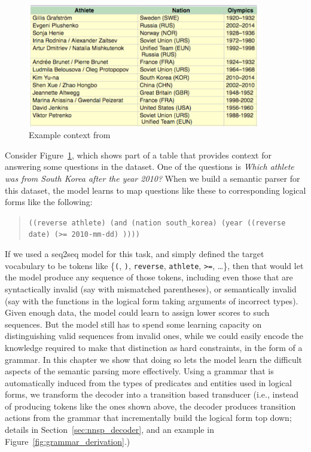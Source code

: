\begin{figure}
	\begin{center}
		\includegraphics[width=4in]{figures/wikitables_example2.png}
		\caption{Example context from
		\WTQ{}~\citep{pasupat2015compositional}}\label{fig:wikitables_reasoning_example}
	\end{center}
\end{figure}
Consider
Figure~\ref{fig:wikitables_reasoning_example}, which shows part of a table that
provides context for answering some questions in the \WTQ{} dataset. One of the
questions is \textit{Which athlete was from South Korea after the year 2010?}
When we build a semantic parser for this dataset, the model learns to map
questions like these to corresponding logical forms like the following:
\begin{quote}
	\texttt{((reverse athlete) (and (nation south\_korea) (year ((reverse
	date) (>= 2010-mm-dd) ))))}
\end{quote}
If we used a seq2seq model for this task, and simply defined the target
vocabulary to be tokens like \{\texttt{(}, \texttt{)}, \texttt{reverse},
\texttt{athlete}, \texttt{>=}, \ldots\}, then that would let the
model produce any sequence of those tokens, including even those that are
syntactically invalid (say with mismatched parentheses), or semantically invalid
(say with the functions in the logical form taking arguments of incorrect
types). Given enough data, the model could learn to assign lower scores to such
sequences. But the model still has to spend some learning capacity on
distinguishing valid sequences from invalid ones, while we could easily encode
the knowledge required to make that distinction as hard constraints, in the form
of a grammar. In this chapter we show that doing so lets the model learn the
difficult aspects of the semantic parsing more effectively. Using a grammar that
is automatically induced from the types of predicates and entities used in
logical forms, we transform the decoder into a transition based transducer
(i.e., instead of producing tokens like the ones shown above, the decoder
produces transition actions from the grammar that incrementally build the
logical form top down; details in Section~\ref{sec:nnsp_decoder}, and an example
in Figure~\ref{fig:grammar_derivation}.)

